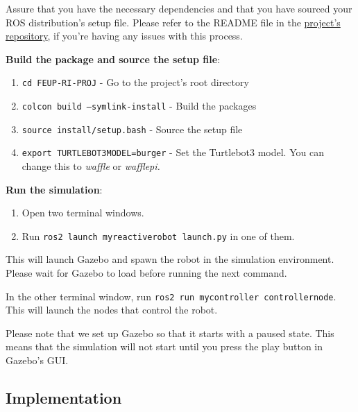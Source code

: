 \documentclass[conference]{IEEEtran}
\begin{document}
Assure that you have the necessary dependencies and that you have sourced your ROS distribution's setup file. Please refer to the README file in the \href{https://github.com/carlosverissimo3001/FEUP-RI-PROJ/}{project's repository}, if you're having any issues with this process.

\vskip 0.1in

\textbf{Build the package and source the setup file}:

\begin{enumerate}
    \item \texttt{cd FEUP-RI-PROJ} - Go to the project's root directory
    \item \texttt{colcon build --symlink-install} - Build the packages
    \item \texttt{source install/setup.bash} - Source the setup file
    \item \texttt{export TURTLEBOT3\textunderscore MODEL=burger} - Set the Turtlebot3 model.
          You can change this to \emph{waffle} or \emph{waffle\textunderscore pi.}
\end{enumerate}

\vskip 0.1in

\textbf{Run the simulation}:


\begin{enumerate}
    \item Open two terminal windows.
    \item Run \texttt{ros2 launch my\textunderscore reactive\textunderscore robot launch.py} in one of them.
\end{enumerate}

This will launch Gazebo and spawn the robot in the simulation environment. Please wait for Gazebo to load before running
the next command.

In the other terminal window, run \texttt{ros2 run my\textunderscore controller controller\textunderscore node}.
This will launch the nodes that control the robot.

\vskip 0.1in

Please note that we set up Gazebo so that it starts with a paused state. This means that the simulation will not start
until you press the play button in Gazebo's GUI.

\subsection{Implementation}

\end{document}
